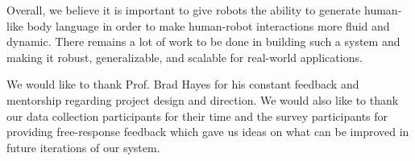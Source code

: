 Overall, we believe it is important to give robots the ability to generate human-like body language in order to make human-robot interactions more fluid and dynamic. There remains a lot of work to be done in building such a system and making it robust, generalizable, and scalable for real-world applications.
\begin{acks}
We would like to thank Prof. Brad Hayes for his constant feedback and mentorship regarding project design and direction. We would also like to thank our data collection participants for their time and the survey participants for providing free-response feedback which gave us ideas on what can be improved in future iterations of our system.
\end{acks}